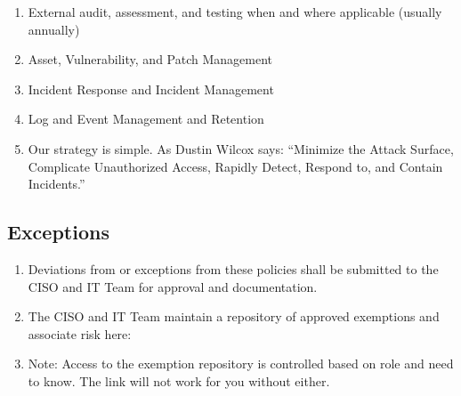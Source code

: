 \documentclass[../main.tex]{subfiles}
\begin{document}
\begin{enumerate}
\begin{enumerate}
      \item External audit, assessment, and testing when and where applicable (usually annually)
      \item Asset, Vulnerability, and Patch Management
      \item Incident Response and Incident Management
      \item Log and Event Management and Retention
      \item Our strategy is simple. As Dustin Wilcox says: “Minimize the Attack Surface, Complicate Unauthorized Access, Rapidly Detect, Respond to, and Contain Incidents.”
    \end{enumerate}
  \end{enumerate}
  \subsection{Exceptions}
  \begin{enumerate}
    \item Deviations from or exceptions from these policies shall be submitted to the CISO and IT Team for approval and documentation.
    \item The CISO and IT Team maintain a repository of approved exemptions and associate risk here: \ExceptionsRegistry
    \item Note: Access to the exemption repository is controlled based on role and need to know. The link will not work for you without either.
  \end{enumerate}
\end{document}
